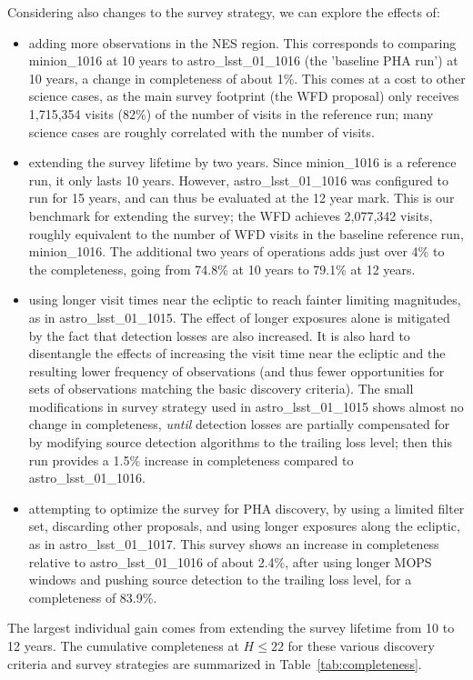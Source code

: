 Considering also changes to the survey strategy, we can explore the effects of:
\begin{itemize}
\item adding more observations in the NES region. This corresponds to comparing minion\_1016 at 10 years to astro\_lsst\_01\_1016 (the 'baseline PHA run') at 10 years, a change in completeness of about 1\%. This comes at a cost to other science cases, as the main survey footprint (the WFD proposal) only receives 1,715,354 visits (82\%) of the number of visits in the reference run; many science cases are roughly correlated with the number of visits. 
\item extending the survey lifetime by two years. Since minion\_1016 is a reference run, it only lasts 10 years. However, astro\_lsst\_01\_1016 was configured to run for 15 years, and can thus be evaluated at the 12 year mark. This is our benchmark for extending the survey; the WFD achieves 2,077,342 visits, roughly equivalent to the number of WFD visits in the baseline reference run, minion\_1016.  The additional two years of operations adds just over 4\% to the completeness, going from 74.8\% at 10 years to 79.1\% at 12 years. 
\item using longer visit times near the ecliptic to reach fainter limiting magnitudes, as in astro\_lsst\_01\_1015. The effect of longer exposures alone is mitigated by the fact that detection losses are also increased. It is also hard to disentangle the effects of increasing the visit time near the ecliptic and the resulting lower frequency of observations (and thus fewer opportunities for sets of observations matching the basic discovery criteria). The small modifications in survey strategy used in astro\_lsst\_01\_1015 shows almost no change in completeness, {\it until} detection losses are partially compensated for by modifying source detection algorithms to the trailing loss level; then this run provides a 1.5\% increase in completeness compared to astro\_lsst\_01\_1016. 
\item attempting to optimize the survey for PHA discovery, by using a limited filter set, discarding other proposals, and using longer exposures along the ecliptic, as in astro\_lsst\_01\_1017. This survey shows an increase in completeness relative to astro\_lsst\_01\_1016 of about 2.4\%, after using longer MOPS windows and pushing source detection to the trailing loss level, for a  completeness of 83.9\%. 
\end{itemize}

The largest individual gain comes from extending the survey lifetime from 10 to 12 years. The cumulative completeness at $H\le22$ for these various discovery criteria and survey strategies are summarized in Table~\ref{tab:completeness}. 

